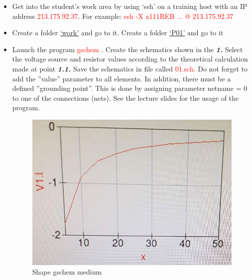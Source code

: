 \documentclass{report}
\begin{document}
\begin{itemize}
  \item Get into the student’s work area by using ‘ssh’ on a training host with an IP address
\textcolor{red}{213.175.92.37}. For example: \textcolor{red}{ssh -X x111REB ... @ 213.175.92.37}
  \item Create a folder \underline{‘work’} and go to it. Create a folder \underline{‘P01’} and go to it
  
  \item Launch the program \textcolor{red}{gschem} . Create the schematics shown in the \textbf{\textit{1. }}Select the voltage
source and resistor values according to the theoretical calculation made at point \textbf{\textit{1.1.}}
Save the schematics in file called \textcolor{red}{01.sch}. Do not forget to add the ”value” parameter
to all elements. In addition, there must be a defined ”grounding point”. This is done by
assigning parameter netname = 0 to one of the connections (nets). See the lecture slides
for the usage of the program. \cite{firstRef}

\begin{figure}[ht]
\includegraphics{Figures/figure_3_.jpg}
\caption{Shape gschem medium}
\label{fig:figure1}
\end{figure}



\end{itemize}
\end{document}
